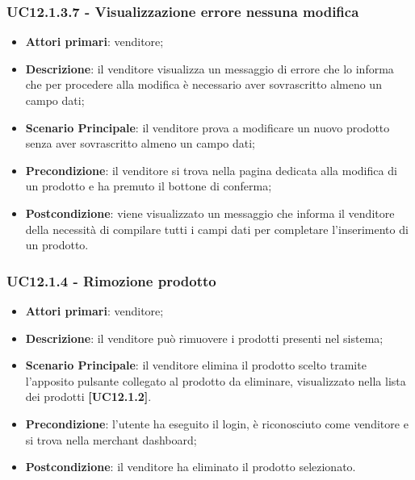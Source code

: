 \subsubsection{UC12.1.3.7 - Visualizzazione errore nessuna modifica}
\begin{itemize}
\item \textbf{Attori primari}: venditore;
\item \textbf{Descrizione}: il venditore visualizza un messaggio di errore che lo informa che per procedere alla modifica è necessario aver sovrascritto almeno un campo dati;
\item \textbf{Scenario Principale}: il venditore prova a modificare un nuovo prodotto senza aver sovrascritto almeno un campo dati;
\item \textbf{Precondizione}: il venditore si trova nella pagina dedicata alla modifica di un prodotto e ha premuto il bottone di conferma;
\item \textbf{Postcondizione}: viene visualizzato un messaggio che informa il venditore della necessità di compilare tutti i campi dati per completare l'inserimento di un prodotto.
\end{itemize}

\subsubsection{UC12.1.4 - Rimozione prodotto}
\begin{itemize}
\item \textbf{Attori primari}: venditore;
\item \textbf{Descrizione}: il venditore può rimuovere i prodotti presenti nel sistema;
\item \textbf{Scenario Principale}: il venditore elimina il prodotto scelto tramite l'apposito pulsante collegato al prodotto da eliminare, visualizzato nella lista dei prodotti \textbf{[UC12.1.2]}.
\item \textbf{Precondizione}: l'utente ha eseguito il login, è riconosciuto come venditore e si trova nella merchant dashboard;
\item \textbf{Postcondizione}: il venditore ha eliminato il prodotto selezionato.
\end{itemize}

